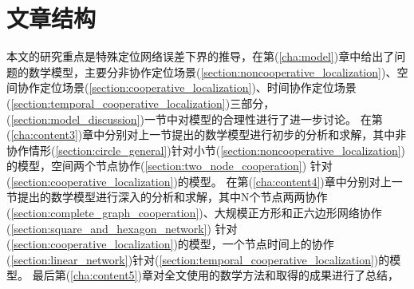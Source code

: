 \section{文章结构}
本文的研究重点是特殊定位网络误差下界的推导，在第(\ref{cha:model})章中给出了问题的数学模型，主要分非协作定位场景(\ref{section:noncooperative_localization})、空间协作定位场景(\ref{section:cooperative_localization})、时间协作定位场景(\ref{section:temporal_cooperative_localization})三部分，(\ref{section:model_discussion})一节中对模型的合理性进行了进一步讨论。
在第(\ref{cha:content3})章中分别对上一节提出的数学模型进行初步的分析和求解，其中非协作情形(\ref{section:circle_general})针对小节(\ref{section:noncooperative_localization})的模型，空间两个节点协作(\ref{section:two_node_cooperation})
针对(\ref{section:cooperative_localization})的模型。
在第(\ref{cha:content4})章中分别对上一节提出的数学模型进行深入的分析和求解，其中N个节点两两协作(\ref{section:complete_graph_cooperation})、大规模正方形和正六边形网络协作(\ref{section:square_and_hexagon_network})
针对(\ref{section:cooperative_localization})的模型，一个节点时间上的协作(\ref{section:linear_network})针对(\ref{section:temporal_cooperative_localization})的模型。
最后第(\ref{cha:content5})章对全文使用的数学方法和取得的成果进行了总结，